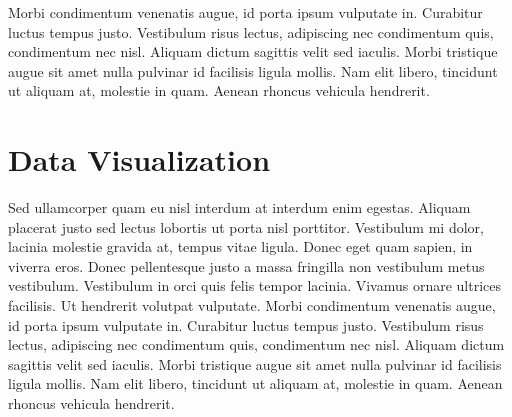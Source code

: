 Morbi condimentum venenatis augue, id porta ipsum vulputate in. Curabitur luctus tempus justo. Vestibulum risus lectus, adipiscing nec condimentum quis, condimentum nec nisl. Aliquam dictum sagittis velit sed iaculis. Morbi tristique augue sit amet nulla pulvinar id facilisis ligula mollis. Nam elit libero, tincidunt ut aliquam at, molestie in quam. Aenean rhoncus vehicula hendrerit.

\section{Data Visualization}
Sed ullamcorper quam eu nisl interdum at interdum enim egestas. Aliquam placerat justo sed lectus lobortis ut porta nisl porttitor. Vestibulum mi dolor, lacinia molestie gravida at, tempus vitae ligula. Donec eget quam sapien, in viverra eros. Donec pellentesque justo a massa fringilla non vestibulum metus vestibulum. Vestibulum in orci quis felis tempor lacinia. Vivamus ornare ultrices facilisis. Ut hendrerit volutpat vulputate. Morbi condimentum venenatis augue, id porta ipsum vulputate in. Curabitur luctus tempus justo. Vestibulum risus lectus, adipiscing nec condimentum quis, condimentum nec nisl. Aliquam dictum sagittis velit sed iaculis. Morbi tristique augue sit amet nulla pulvinar id facilisis ligula mollis. Nam elit libero, tincidunt ut aliquam at, molestie in quam. Aenean rhoncus vehicula hendrerit.